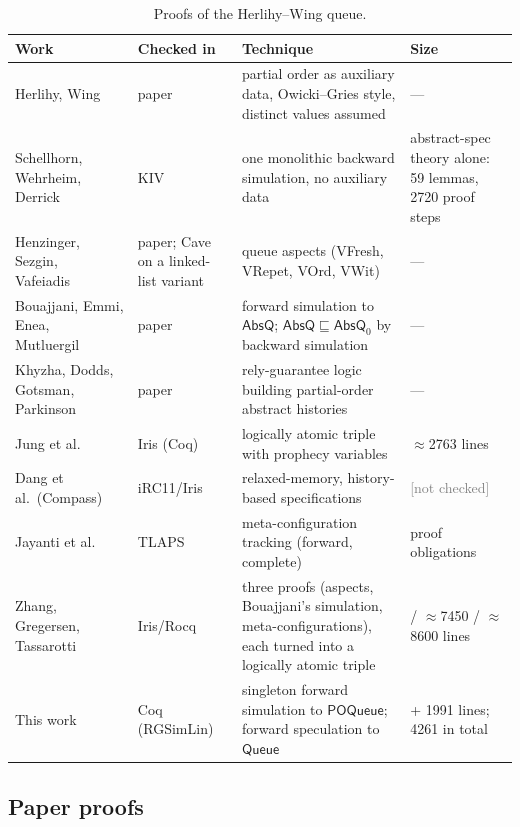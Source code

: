 \documentclass[11pt]{article}
\newcommand{\POQueue}{\mathsf{POQueue}}
\newcommand{\Queue}{\mathsf{Queue}}
\newcommand{\AbsQ}{\mathsf{AbsQ}}
\newcommand{\AbsQz}{\mathsf{AbsQ}_0}
\newcommand{\unverified}[1]{\textcolor{gray}{[#1]}}
\begin{document}
\begin{table}[ht]
\centering\small
\renewcommand{\arraystretch}{1.25}
\begin{tabularx}{\textwidth}{@{}>{\raggedright\arraybackslash}p{3.2cm}
  >{\raggedright\arraybackslash}p{1.9cm}
  >{\raggedright\arraybackslash}X
  >{\raggedright\arraybackslash}p{3.1cm}@{}}
\toprule
Work & Checked in & Technique & Size \\
\midrule
Herlihy, Wing~\cite{HW90} & paper & partial order as auxiliary data,
  Owicki--Gries style, distinct values assumed & --- \\
Schellhorn, Wehrheim, Derrick~\cite{SWD12,SDW14} & KIV & one monolithic
  backward simulation, no auxiliary data & abstract-spec theory alone: 59
  lemmas, 2720 proof steps \\
Henzinger, Sezgin, Vafeiadis~\cite{HSV13,CHSV15} & paper; Cave on a
  linked-list variant & queue aspects (VFresh, VRepet, VOrd, VWit) & --- \\
Bouajjani, Emmi, Enea, Mutluergil~\cite{BEEM17} & paper & forward
  simulation to $\AbsQ$; $\AbsQ \sqsubseteq \AbsQz$ by backward
  simulation & --- \\
Khyzha, Dodds, Gotsman, Parkinson~\cite{KDGP17} & paper &
  rely-guarantee logic building partial-order abstract histories & --- \\
Jung et al.~\cite{Jung20} & Iris (Coq) & logically atomic triple with
  prophecy variables & $\approx$2763 lines \\
Dang et al.\ (Compass)~\cite{Compass22} & iRC11/Iris & relaxed-memory,
  history-based specifications & \unverified{not checked} \\
Jayanti et al.~\cite{JJYH24} & TLAPS & meta-configuration tracking
  (forward, complete) & 2959 proof obligations \\
Zhang, Gregersen, Tassarotti~\cite{ZGT26} & Iris/Rocq & three proofs
  (aspects, Bouajjani's simulation, meta-configurations), each turned into
  a logically atomic triple & 2004 / $\approx$7450 / $\approx$8600
  lines \\
\midrule
This work & Coq (RGSimLin) & singleton forward simulation to $\POQueue$;
  forward speculation to $\Queue$ & 1279 + 1991 lines; 4261 in total \\
\bottomrule
\end{tabularx}
\caption{Proofs of the Herlihy--Wing queue.}
\label{tab:overview}
\end{table}

\subsection{Paper proofs}
\end{document}
